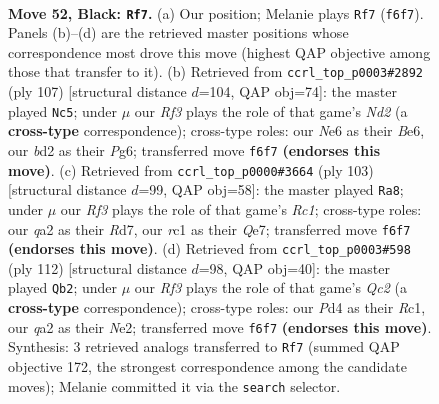 \documentclass[11pt]{article}
\begin{document}
\clearpage

\begin{figure}[p]\centering
\begin{subfigure}{0.46\textwidth}\centering
\resizebox{\linewidth}{!}{%
\newchessgame
\chessboard[
  setfen={nr6/1q2b2k/p3nr2/P1p2p1p/3p1Pp1/1P4P1/QR1BP2P/2RNN1K1 b - - 21 52},
  showmover=false,
  pgfstyle=straightmove, color=movearrow, markmove={f6-f7}
]}
\caption{}
\end{subfigure}\hfill
\begin{subfigure}{0.46\textwidth}\centering
\resizebox{\linewidth}{!}{%
\newchessgame
\chessboard[
  setfen={1q6/3n1p1k/rr1pb1p1/4p2p/1pP1P2P/1B1R1P2/P1N2RP1/4Q2K b - - 0 54},
  showmover=false,
  pgfstyle=straightmove, color=movearrow, markmove={d7-c5}
]}
\caption{}
\end{subfigure}
\\[4pt]
\begin{subfigure}{0.46\textwidth}\centering
\resizebox{\linewidth}{!}{%
\newchessgame
\chessboard[
  setfen={2r3k1/3rqp2/1pbpn1p1/7p/1PP1Pp1P/1B1R1N2/1Q3PP1/4R1K1 b - - 34 52},
  showmover=false,
  pgfstyle=straightmove, color=movearrow, markmove={c8-a8}
]}
\caption{}
\end{subfigure}\hfill
\begin{subfigure}{0.46\textwidth}\centering
\resizebox{\linewidth}{!}{%
\newchessgame
\chessboard[
  setfen={1k1q3r/1b6/2p1pr2/p2p4/PbP2P1p/1P3B1P/2Q1N1P1/2R2R1K w - - 7 57},
  showmover=false,
  pgfstyle=straightmove, color=movearrow, markmove={c2-b2}
]}
\caption{}
\end{subfigure}
\caption{\textbf{Move 52, Black: \texttt{Rf7}.} (a) Our position; Melanie plays \texttt{Rf7} (\texttt{f6f7}). Panels (b)--(d) are the retrieved master positions whose correspondence most drove this move (highest QAP objective among those that transfer to it). (b) Retrieved from \texttt{ccrl\_top\_p0003\#2892} (ply 107) [structural distance $d$=104, QAP obj=74]: the master played \texttt{Nc5}; under $\mu$ our \emph{Rf3} plays the role of that game's \emph{Nd2} (a \textbf{cross-type} correspondence); cross-type roles: our \emph{N}e6 as their \emph{B}e6, our \emph{b}d2 as their \emph{P}g6; transferred move \texttt{f6f7} \textbf{(endorses this move)}. (c) Retrieved from \texttt{ccrl\_top\_p0000\#3664} (ply 103) [structural distance $d$=99, QAP obj=58]: the master played \texttt{Ra8}; under $\mu$ our \emph{Rf3} plays the role of that game's \emph{Rc1}; cross-type roles: our \emph{q}a2 as their \emph{R}d7, our \emph{r}c1 as their \emph{Q}e7; transferred move \texttt{f6f7} \textbf{(endorses this move)}. (d) Retrieved from \texttt{ccrl\_top\_p0003\#598} (ply 112) [structural distance $d$=98, QAP obj=40]: the master played \texttt{Qb2}; under $\mu$ our \emph{Rf3} plays the role of that game's \emph{Qc2} (a \textbf{cross-type} correspondence); cross-type roles: our \emph{P}d4 as their \emph{R}c1, our \emph{q}a2 as their \emph{N}e2; transferred move \texttt{f6f7} \textbf{(endorses this move)}. Synthesis: 3 retrieved analogs transferred to \texttt{Rf7} (summed QAP objective 172, the strongest correspondence among the candidate moves); Melanie committed it via the \texttt{search} selector.}
\label{fig:thought-m103}
\end{figure}
\end{document}
